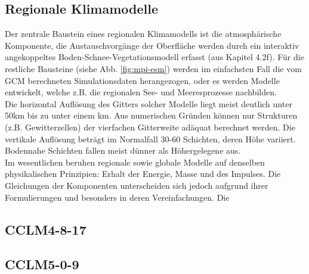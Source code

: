 \subsection{Regionale Klimamodelle}
Der zentrale Baustein eines regionalen Klimamodells ist die atmosphärische Komponente, die Austauschvorgänge der Oberfläche werden durch ein interaktiv angekoppeltes Boden-Schnee-Vegetationsmodell erfasst (aus \cite{RCM} Kapitel 4.2f). Für die restliche Bausteine (siehe Abb. \ref{fig:mpi-esm}) werden im einfachsten Fall die vom GCM berechneten Simulationsdaten herangezogen, oder es werden Modelle entwickelt, welche z.B. die regionalen See- und Meeresprozesse nachbilden.\\
Die horizontal Auflösung des Gitters solcher Modelle liegt meist deutlich unter 50km bis zu unter einem km. Aus numerischen Gründen können nur Strukturen (z.B. Gewitterzellen) der vierfachen Gitterweite adäquat berechnet werden. Die vertikale Auflösung beträgt im Normalfall 30-60 Schichten, deren Höhe variiert. Bodennahe Schichten fallen meist dünner als Höhergelegene aus.\\
Im wesentlichen beruhen regionale sowie globale Modelle auf denselben physikalischen Prinzipien: Erhalt der Energie, Masse und des Impulses. Die Gleichungen der Komponenten unterscheiden sich jedoch aufgrund ihrer Formulierungen und besonders in deren Vereinfachungen. Die 
\subsection{CCLM4-8-17}


\subsection{CCLM5-0-9}